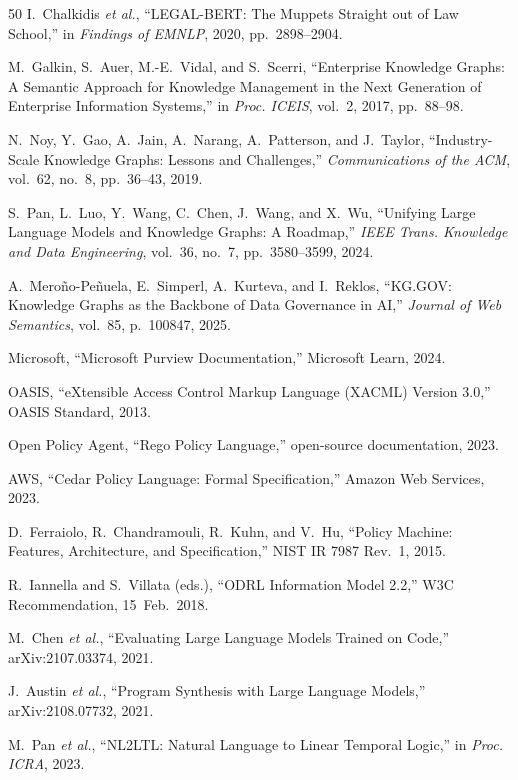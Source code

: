 \documentclass{ieeeaccess}
\begin{document}
\begin{thebibliography}{50}
I.~Chalkidis \textit{et al.}, ``LEGAL-BERT: The Muppets Straight out of Law School,'' in \textit{Findings of EMNLP}, 2020, pp.~2898--2904.

M.~Galkin, S.~Auer, M.-E.~Vidal, and S.~Scerri, ``Enterprise Knowledge Graphs: A Semantic Approach for Knowledge Management in the Next Generation of Enterprise Information Systems,'' in \textit{Proc. ICEIS}, vol.~2, 2017, pp.~88--98.

N.~Noy, Y.~Gao, A.~Jain, A.~Narang, A.~Patterson, and J.~Taylor, ``Industry-Scale Knowledge Graphs: Lessons and Challenges,'' \textit{Communications of the ACM}, vol.~62, no.~8, pp.~36--43, 2019.

S.~Pan, L.~Luo, Y.~Wang, C.~Chen, J.~Wang, and X.~Wu, ``Unifying Large Language Models and Knowledge Graphs: A Roadmap,'' \textit{IEEE Trans. Knowledge and Data Engineering}, vol.~36, no.~7, pp.~3580--3599, 2024.

A.~Mero\~{n}o-Pe\~{n}uela, E.~Simperl, A.~Kurteva, and I.~Reklos, ``KG.GOV: Knowledge Graphs as the Backbone of Data Governance in AI,'' \textit{Journal of Web Semantics}, vol.~85, p.~100847, 2025.

Microsoft, ``Microsoft Purview Documentation,'' Microsoft Learn, 2024.

OASIS, ``eXtensible Access Control Markup Language (XACML) Version 3.0,'' OASIS Standard, 2013.

Open Policy Agent, ``Rego Policy Language,'' open-source documentation, 2023.

AWS, ``Cedar Policy Language: Formal Specification,'' Amazon Web Services, 2023.

D.~Ferraiolo, R.~Chandramouli, R.~Kuhn, and V.~Hu, ``Policy Machine: Features, Architecture, and Specification,'' NIST IR 7987 Rev.~1, 2015.

R.~Iannella and S.~Villata (eds.), ``ODRL Information Model 2.2,'' W3C Recommendation, 15~Feb.~2018.

M.~Chen \textit{et al.}, ``Evaluating Large Language Models Trained on Code,'' arXiv:2107.03374, 2021.

J.~Austin \textit{et al.}, ``Program Synthesis with Large Language Models,'' arXiv:2108.07732, 2021.

M.~Pan \textit{et al.}, ``NL2LTL: Natural Language to Linear Temporal Logic,'' in \textit{Proc. ICRA}, 2023.


\end{thebibliography}
\end{document}
